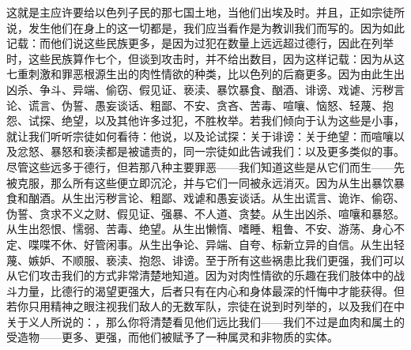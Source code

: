 这就是主应许要给以色列子民的那七国土地，当他们出埃及时。并且，正如宗徒所说，发生他们在身上的这一切都是，我们应当看作是为教训我们而写的。因为如此记载：而他们说这些民族更多，是因为过犯在数量上远远超过德行，因此在列举时，这些民族算作七个，但谈到攻击时，并不给出数目，因为这样记载：因为从这七重刺激和罪恶根源生出的肉性情欲的种类，比以色列的后裔更多。因为由此生出凶杀、争斗、异端、偷窃、假见证、亵渎、暴饮暴食、酗酒、诽谤、戏谑、污秽言论、谎言、伪誓、愚妄谈话、粗鄙、不安、贪吝、苦毒、喧嚷、恼怒、轻蔑、抱怨、试探、绝望，以及其他许多过犯，不胜枚举。若我们倾向于认为这些是小事，就让我们听听宗徒如何看待：他说，以及论试探：关于诽谤：关于绝望：而喧嚷以及忿怒、暴怒和亵渎都是被谴责的，同一宗徒如此告诫我们：以及更多类似的事。尽管这些远多于德行，但若那八种主要罪恶——我们知道这些是从它们而生——先被克服，那么所有这些便立即沉沦，并与它们一同被永远消灭。因为从生出暴饮暴食和酗酒。从生出污秽言论、粗鄙、戏谑和愚妄谈话。从生出谎言、诡诈、偷窃、伪誓、贪求不义之财、假见证、强暴、不人道、贪婪。从生出凶杀、喧嚷和暴怒。从生出怨恨、懦弱、苦毒、绝望。从生出懒惰、嗜睡、粗鲁、不安、游荡、身心不定、喋喋不休、好管闲事。从生出争论、异端、自夸、标新立异的自信。从生出轻蔑、嫉妒、不顺服、亵渎、抱怨、诽谤。至于所有这些祸患比我们更强，我们可以从它们攻击我们的方式非常清楚地知道。因为对肉性情欲的乐趣在我们肢体中的战斗力量，比德行的渴望更强大，后者只有在内心和身体最深的忏悔中才能获得。但若你只用精神之眼注视我们敌人的无数军队，宗徒在说到时列举的，以及我们在中关于义人所说的：，那么你将清楚看见他们远比我们——我们不过是血肉和属土的受造物——更多、更强，而他们被赋予了一种属灵和非物质的实体。\par


